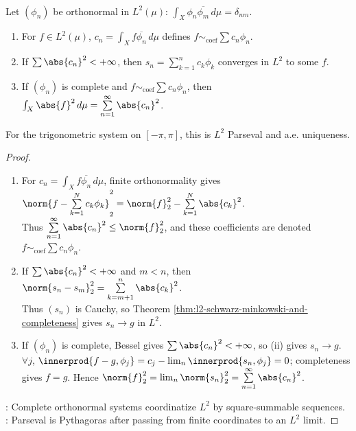 \begin{theorem} \label{thm:l2-orthonormal-systems-riesz-fischer-parseval} \\
Let $(\phi_n)$ be orthonormal in $L^2(\mu)$: $\int_X\phi_n\overline{\phi_m}\,d\mu=\delta_{nm}$.
\begin{enumerate}[label=(\roman*)]
\setlength{\itemsep}{0pt}
\item For $f\in L^2(\mu)$, $c_n=\int_Xf\overline{\phi_n}\,d\mu$ defines $f\sim_{\mathrm{coef}}\sum c_n\phi_n$.
\item If $\sum\abs{c_n}^2<+\infty$, then $s_n=\sum\limits_{k=1}^{n}c_k\phi_k$ converges in $L^2$ to some $f$.
\item If $(\phi_n)$ is complete and $f\sim_{\mathrm{coef}}\sum c_n\phi_n$, then $\int_X\abs{f}^2\,d\mu=\sum\limits_{n=1}^{\infty}\abs{c_n}^2$.
\end{enumerate}
For the trigonometric system on $[-\pi,\pi]$, this is $L^2$ Parseval and a.e. uniqueness.
\begin{proof}
\begin{enumerate}[label=(\roman*)]
\setlength{\itemsep}{0pt}
\item For $c_n=\int_X f\overline{\phi_n}\,d\mu$, finite orthonormality gives $\norm{f-\sum\limits_{k=1}^{N}c_k\phi_k}_2^2=\norm{f}_2^2-\sum\limits_{k=1}^{N}\abs{c_k}^2$.\\
Thus $\sum\limits_{n=1}^{\infty}\abs{c_n}^2\leq\norm{f}_2^2$, and these coefficients are denoted $f\sim_{\mathrm{coef}}\sum c_n\phi_n$.
\item If $\sum\abs{c_n}^2<+\infty$ and $m<n$, then $\norm{s_n-s_m}_2^2=\sum\limits_{k=m+1}^{n}\abs{c_k}^2$.\\
Thus $(s_n)$ is Cauchy, so Theorem \ref{thm:l2-schwarz-minkowski-and-completeness} gives $s_n\to g$ in $L^2$.
\item If $(\phi_n)$ is complete, Bessel gives $\sum\abs{c_n}^2<+\infty$, so (ii) gives $s_n\to g$.\\
$\forall j$, $\innerprod{f-g,\phi_j}=c_j-\lim_n\innerprod{s_n,\phi_j}=0$; completeness gives $f=g$. Hence $\norm{f}_2^2=\lim_n\norm{s_n}_2^2=\sum\limits_{n=1}^{\infty}\abs{c_n}^2$.
\end{enumerate}
: Complete orthonormal systems coordinatize $L^2$ by square-summable sequences.\\
: Parseval is Pythagoras after passing from finite coordinates to an $L^2$ limit.
\end{proof}
\end{theorem}
